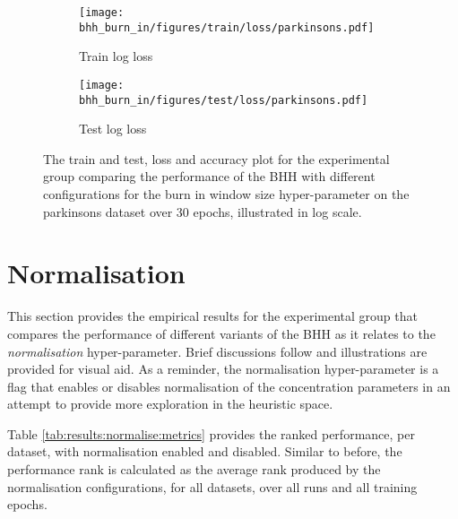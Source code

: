 \begin{figure}[H]
	\begin{subfigure}{0.5\textwidth}
		\centering
		\texttt{[image: bhh\_burn\_in/figures/train/loss/parkinsons.pdf]}
		\caption{Train log loss}
		\label{fig:results:burn_in:figures:loss:train:parkinsons}
	\end{subfigure}
	\begin{subfigure}{0.5\textwidth}
		\centering
		\texttt{[image: bhh\_burn\_in/figures/test/loss/parkinsons.pdf]}
		\caption{Test log loss}
		\label{fig:results:burn_in:figures:loss:test:parkinsons}
	\end{subfigure}
	\par\bigskip
	\caption{The train and test, loss and accuracy plot for the experimental group comparing the performance of the \acs{BHH} with different configurations for the burn in window size hyper-parameter on the parkinsons dataset over 30 epochs, illustrated in log scale.}
	\label{fig:results:burn_in:figures:parkinsons}
\end{figure}

\section{Normalisation}\label{sec:results:normalise}

This section provides the empirical results for the experimental group that compares the performance of different variants of the \acs{BHH} as it relates to the \textit{normalisation} hyper-parameter. Brief discussions follow and illustrations are provided for visual aid. As a reminder, the normalisation hyper-parameter is a flag that enables or disables normalisation of the concentration parameters in an attempt to provide more exploration in the heuristic space.

Table \ref{tab:results:normalise:metrics} provides the ranked performance, per dataset, with normalisation enabled and disabled. Similar to before, the performance rank is calculated as the average rank produced by the normalisation configurations, for all datasets, over all runs and all training epochs.

